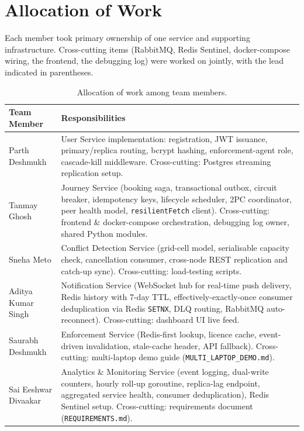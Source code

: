 \documentclass[12pt,a4paper]{article}
\begin{document}
\newpage
\section{Allocation of Work}
\label{sec:allocation}
 
Each member took primary ownership of one service and supporting infrastructure. Cross-cutting items (RabbitMQ, Redis Sentinel, docker-compose wiring, the frontend, the debugging log) were worked on jointly, with the lead indicated in parentheses.
 
\begin{table}[H]
    \centering
    \small
    \begin{tabularx}{\textwidth}{L{3.6cm} X}
        \toprule
        \textbf{Team Member} & \textbf{Responsibilities} \\
        \midrule
        Parth Deshmukh & User Service implementation: registration, JWT issuance, primary/replica routing, bcrypt hashing, enforcement-agent role, cascade-kill middleware. Cross-cutting: Postgres streaming replication setup. \\\addlinespace[0.1cm]
        Tanmay Ghosh & Journey Service (booking saga, transactional outbox, circuit breaker, idempotency keys, lifecycle scheduler, 2PC coordinator, peer health model, \texttt{resilientFetch} client). Cross-cutting: frontend \& docker-compose orchestration, debugging log owner, shared Python modules. \\\addlinespace[0.1cm]
        Sneha Meto & Conflict Detection Service (grid-cell model, serialisable capacity check, cancellation consumer, cross-node REST replication and catch-up sync). Cross-cutting: load-testing scripts. \\\addlinespace[0.1cm]
        Aditya Kumar Singh & Notification Service (WebSocket hub for real-time push delivery, Redis history with 7-day TTL, effectively-exactly-once consumer deduplication via Redis \texttt{SETNX}, DLQ routing, RabbitMQ auto-reconnect). Cross-cutting: dashboard UI live feed. \\\addlinespace[0.1cm]
        Saurabh Deshmukh & Enforcement Service (Redis-first lookup, licence cache, event-driven invalidation, stale-cache header, API fallback). Cross-cutting: multi-laptop demo guide (\texttt{MULTI\_LAPTOP\_DEMO.md}). \\\addlinespace[0.1cm]
        Sai Eeshwar Divaakar & Analytics \& Monitoring Service (event logging, dual-write counters, hourly roll-up goroutine, replica-lag endpoint, aggregated service health, consumer deduplication), Redis Sentinel setup. Cross-cutting: requirements document (\texttt{REQUIREMENTS.md}). \\
        \bottomrule
    \end{tabularx}
    \caption{Allocation of work among team members.}
    \label{tab:work-allocation}
\end{table}
 
\end{document}
